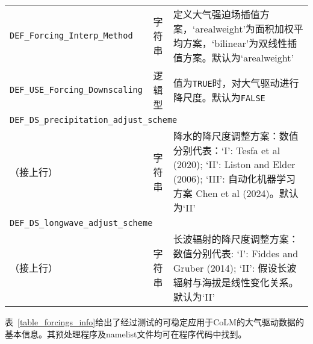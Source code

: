 {\begin{longtable}[!htbp]{lcp{}}
\texttt{DEF\_Forcing\_Interp\_Method} & 字符串 & 定义大气强迫场插值方案，`arealweight'为面积加权平均方案，`bilinear'为双线性插值方案。默认为`arealweight' \\
\texttt{DEF\_USE\_Forcing\_Downscaling} & 逻辑型 & 值为\texttt{TRUE}时，对大气驱动进行降尺度。默认为\texttt{FALSE} \\
\multicolumn{3}{l}{\texttt{DEF\_DS\_precipitation\_adjust\_scheme}} \\
（接上行）& 字符串 & 降水的降尺度调整方案：数值分别代表：`I': Tesfa et al (2020); `II': Liston and Elder (2006); `III': 自动化机器学习方案 Chen et al (2024)。默认为`II' \\
\multicolumn{3}{l}{\texttt{DEF\_DS\_longwave\_adjust\_scheme}} \\
（接上行）& 字符串 & 长波辐射的降尺度调整方案：数值分别代表: `I': Fiddes and Gruber (2014); `II': 假设长波辐射与海拔是线性变化关系。默认为`II' \\
\end{longtable}}

表~\ref{table_forcings_info}给出了经过测试的可稳定应用于CoLM的大气驱动数据的基本信息。其预处理程序及namelist文件均可在程序代码中找到。

